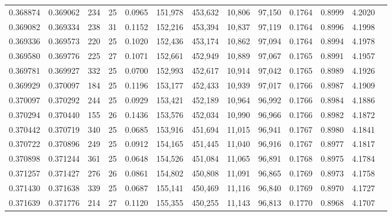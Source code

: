 \begin{tabular}{rrrrrrrrrrrrr}
0.368874 & 0.369062 & 234 &  25 &                                     0.0965 & 151,978 & 453,632 &  10,806 &  97,150 & 0.1764 & 0.8999 & 4.2020 \\
0.369082 & 0.369334 & 238 &  31 &                                     0.1152 & 152,216 & 453,394 &  10,837 &  97,119 & 0.1764 & 0.8996 & 4.1998 \\
0.369336 & 0.369573 & 220 &  25 &                                     0.1020 & 152,436 & 453,174 &  10,862 &  97,094 & 0.1764 & 0.8994 & 4.1978 \\
0.369580 & 0.369776 & 225 &  27 &                                     0.1071 & 152,661 & 452,949 &  10,889 &  97,067 & 0.1765 & 0.8991 & 4.1957 \\
0.369781 & 0.369927 & 332 &  25 &                                     0.0700 & 152,993 & 452,617 &  10,914 &  97,042 & 0.1765 & 0.8989 & 4.1926 \\
0.369929 & 0.370097 & 184 &  25 &                                     0.1196 & 153,177 & 452,433 &  10,939 &  97,017 & 0.1766 & 0.8987 & 4.1909 \\
0.370097 & 0.370292 & 244 &  25 &                                     0.0929 & 153,421 & 452,189 &  10,964 &  96,992 & 0.1766 & 0.8984 & 4.1886 \\
0.370294 & 0.370440 & 155 &  26 &                                     0.1436 & 153,576 & 452,034 &  10,990 &  96,966 & 0.1766 & 0.8982 & 4.1872 \\
0.370442 & 0.370719 & 340 &  25 &                                     0.0685 & 153,916 & 451,694 &  11,015 &  96,941 & 0.1767 & 0.8980 & 4.1841 \\
0.370722 & 0.370896 & 249 &  25 &                                     0.0912 & 154,165 & 451,445 &  11,040 &  96,916 & 0.1767 & 0.8977 & 4.1817 \\
0.370898 & 0.371244 & 361 &  25 &                                     0.0648 & 154,526 & 451,084 &  11,065 &  96,891 & 0.1768 & 0.8975 & 4.1784 \\
0.371257 & 0.371427 & 276 &  26 &                                     0.0861 & 154,802 & 450,808 &  11,091 &  96,865 & 0.1769 & 0.8973 & 4.1758 \\
0.371430 & 0.371638 & 339 &  25 &                                     0.0687 & 155,141 & 450,469 &  11,116 &  96,840 & 0.1769 & 0.8970 & 4.1727 \\
0.371639 & 0.371776 & 214 &  27 &                                     0.1120 & 155,355 & 450,255 &  11,143 &  96,813 & 0.1770 & 0.8968 & 4.1707 \\

\end{tabular}
